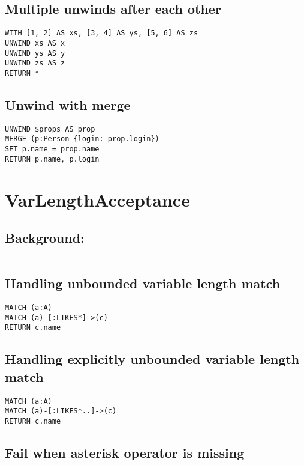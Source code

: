 \subsection{Multiple unwinds after each other}

\begin{lstlisting}
WITH [1, 2] AS xs, [3, 4] AS ys, [5, 6] AS zs
UNWIND xs AS x
UNWIND ys AS y
UNWIND zs AS z
RETURN *
\end{lstlisting}

\subsection{Unwind with merge}

\begin{lstlisting}
UNWIND $props AS prop
MERGE (p:Person {login: prop.login})
SET p.name = prop.name
RETURN p.name, p.login
\end{lstlisting}
\section{VarLengthAcceptance}


\subsection{Background:}

\begin{lstlisting}
\end{lstlisting}

\subsection{Handling unbounded variable length match}

\begin{lstlisting}
MATCH (a:A)
MATCH (a)-[:LIKES*]->(c)
RETURN c.name
\end{lstlisting}

\subsection{Handling explicitly unbounded variable length match}

\begin{lstlisting}
MATCH (a:A)
MATCH (a)-[:LIKES*..]->(c)
RETURN c.name
\end{lstlisting}

\subsection{Fail when asterisk operator is missing}

